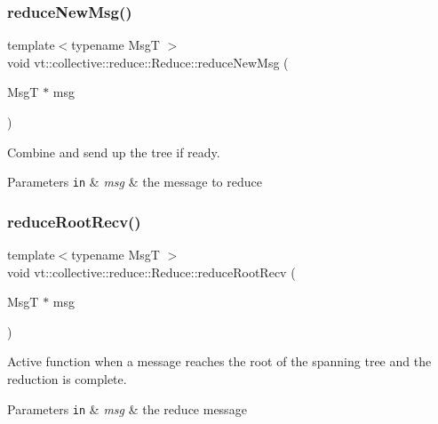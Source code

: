 \subsubsection{\texorpdfstring{reduce\+New\+Msg()}{reduceNewMsg()}}
{\footnotesize\ttfamily template$<$typename MsgT $>$ \\
void vt\+::collective\+::reduce\+::\+Reduce\+::reduce\+New\+Msg (\begin{DoxyParamCaption}\item[{MsgT $\ast$}]{msg }\end{DoxyParamCaption})}



Combine and send up the tree if ready. 


\begin{DoxyParams}[1]{Parameters}
\mbox{\tt in}  & {\em msg} & the message to reduce \\
\hline
\end{DoxyParams}
\mbox{\label{structvt_1_1collective_1_1reduce_1_1_reduce_a48c7bb604fade1b64b9b391f4091ad5b}} 
\subsubsection{\texorpdfstring{reduce\+Root\+Recv()}{reduceRootRecv()}}
{\footnotesize\ttfamily template$<$typename MsgT $>$ \\
void vt\+::collective\+::reduce\+::\+Reduce\+::reduce\+Root\+Recv (\begin{DoxyParamCaption}\item[{MsgT $\ast$}]{msg }\end{DoxyParamCaption})}



Active function when a message reaches the root of the spanning tree and the reduction is complete. 


\begin{DoxyParams}[1]{Parameters}
\mbox{\tt in}  & {\em msg} & the reduce message \\
\hline
\end{DoxyParams}
\mbox{\label{structvt_1_1collective_1_1reduce_1_1_reduce_a2bae42586b143c42c731bcd9c96d4426}} 
